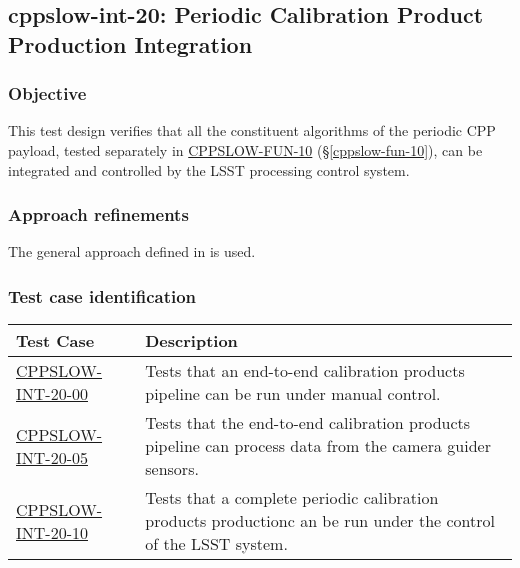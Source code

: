 \subsection{cppslow-int-20: Periodic Calibration Product Production Integration}
\label{cppslow-int-20}

\subsubsection{Objective}

This test design verifies that all the constituent algorithms of the periodic
CPP payload, tested separately in \hyperref[cppslow-fun-10]{CPPSLOW-FUN-10}
(\S\ref{cppslow-fun-10}), can be integrated and controlled by the LSST
processing control system.

\subsubsection{Approach refinements}

The general approach defined in  is used.

\subsubsection{Test case identification}

\begin{longtable} {|p{}|p{}|}\hline
\textbf{Test Case}  & \textbf{Description} \\\hline

\hyperref[cppslow-int-20-00]{CPPSLOW-INT-20-00} & Tests that an end-to-end calibration products pipeline can be run under manual control.\\\hline
\hyperref[cppslow-int-20-05]{CPPSLOW-INT-20-05} & Tests that the end-to-end calibration products pipeline can process data from the camera guider sensors.\\\hline
\hyperref[cppslow-int-20-10]{CPPSLOW-INT-20-10} & Tests that a complete periodic calibration products productionc an be run under the control of the LSST system.\\\hline
\end{longtable}
